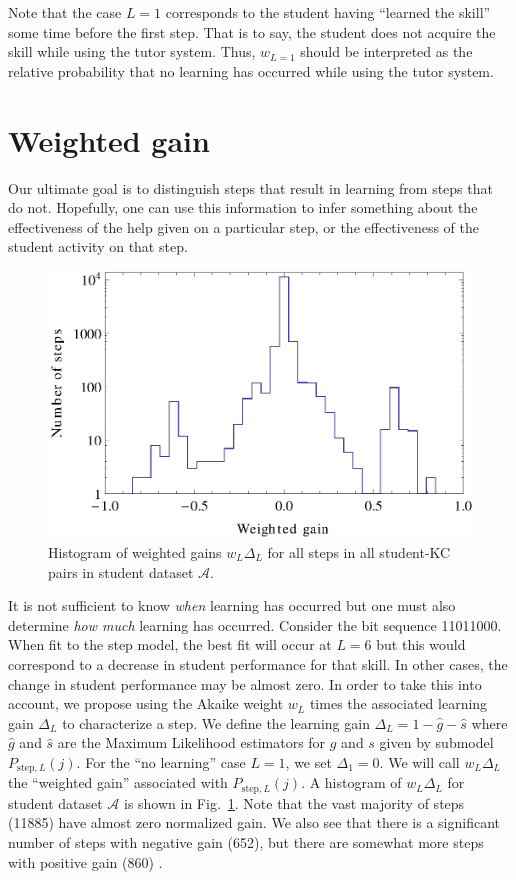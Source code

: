 \documentclass[11pt,letterpaper]{article}
\begin{document}
Note that the case $L=1$ corresponds to the student having 
``learned the skill'' some time before the first step.  That is to say, 
the student does not acquire the skill while using the tutor system.
Thus, $w_{L=1}$ should be interpreted as the relative probability
that no learning has occurred while using the tutor system.

\section{Weighted gain}

Our ultimate goal is to distinguish steps that result in 
learning from steps that do not.  Hopefully, one can use this
information to infer something about the effectiveness of the help
given on a particular step, or the effectiveness of
the student activity on that step.

\begin{figure}
  \centering \includegraphics{weighted-gain-histogram.eps}
   \caption{Histogram of weighted gains $w_L \Delta_L$ for
     all steps in all student-KC pairs in student dataset $\mathcal{A}$.}
    \label{weighted-gain-histogram}
\end{figure}

It is not sufficient to know {\it when} learning has occurred but 
one must also determine {\it how much} learning has occurred.  
Consider the bit sequence 11011000.   When fit to the step model,  
the best fit will occur at $L=6$ but this would correspond to a
decrease in student performance for that skill.  In other cases, the 
change in student performance may be almost zero.  
In order to take this into account, we propose 
using the Akaike weight $w_L$ times the associated learning gain $\Delta_L$
to characterize a step.
We define the learning gain $\Delta_L=1-\hat{g}-\hat{s}$ where $\hat{g}$ and $\hat{s}$
are the Maximum Likelihood estimators for $g$ and $s$ given
by submodel  $P_{\mathrm{step},L}(j)$.   For the ``no learning''
case $L=1$, we set $\Delta_1=0$.
We will call  $w_L \Delta_L$ the ``weighted gain'' associated with 
$P_{\mathrm{step},L}(j)$.
A histogram of $w_L \Delta_L$ for student dataset $\mathcal{A}$ is
shown in Fig.~\ref{weighted-gain-histogram}.  Note that the vast
majority of steps (11885) have almost zero normalized gain.  We also see that there
is a significant number of steps with negative gain (652),
but there are somewhat more steps with positive gain (860) .
\end{document}
